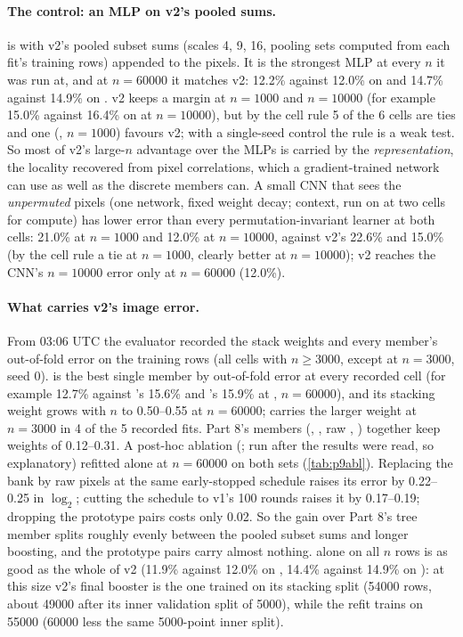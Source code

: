 \paragraph{The control: an MLP on v2's pooled sums.}  is  with v2's pooled subset sums (scales 4, 9, 16, pooling sets computed from each fit's training rows) appended to the pixels. It is the strongest MLP at every $n$ it was run at, and at $n=60000$ it matches v2: 12.2\% against 12.0\% on  and 14.7\% against 14.9\% on . v2 keeps a margin at $n=1000$ and $n=10000$ (for example 15.0\% against 16.4\% on  at $n=10000$), but by the cell rule 5 of the 6 cells are ties and one (, $n=1000$) favours v2; with a single-seed control the rule is a weak test. So most of v2's large-$n$ advantage over the MLPs is carried by the \emph{representation}, the locality recovered from pixel correlations, which a gradient-trained network can use as well as the discrete members can. A small CNN that sees the \emph{unpermuted} pixels (one network, fixed weight decay; context, run on  at two cells for compute) has lower error than every permutation-invariant learner at both cells: 21.0\% at $n=1000$ and 12.0\% at $n=10000$, against v2's 22.6\% and 15.0\% (by the cell rule a tie at $n=1000$, clearly better at $n=10000$); v2 reaches the CNN's $n=10000$ error only at $n=60000$ (12.0\%).

\paragraph{What carries v2's image error.} From 03:06 UTC the evaluator recorded the stack weights and every member's out-of-fold error on the training rows (all cells with $n\ge3000$, except  at $n=3000$, seed 0).  is the best single member by out-of-fold error at every recorded cell (for example 12.7\% against 's 15.6\% and 's 15.9\% at , $n=60000$), and its stacking weight grows with $n$ to 0.50--0.55 at $n=60000$;  carries the larger weight at $n=3000$ in 4 of the 5 recorded fits. Part 8's members (, , raw , ) together keep weights of 0.12--0.31. A post-hoc ablation (; run after the results were read, so explanatory) refitted  alone at $n=60000$ on both sets (\cref{tab:p9abl}). Replacing the bank by raw pixels at the same early-stopped schedule raises its error by 0.22--0.25 in $\log_2$; cutting the schedule to v1's 100 rounds raises it by 0.17--0.19; dropping the prototype pairs costs only 0.02. So the gain over Part 8's tree member splits roughly evenly between the pooled subset sums and longer boosting, and the prototype pairs carry almost nothing.  alone on all $n$ rows is as good as the whole of v2 (11.9\% against 12.0\% on , 14.4\% against 14.9\% on ): at this size v2's final booster is the one trained on its stacking split (54000 rows, about 49000 after its inner validation split of 5000), while the refit trains on 55000 (60000 less the same 5000-point inner split).

